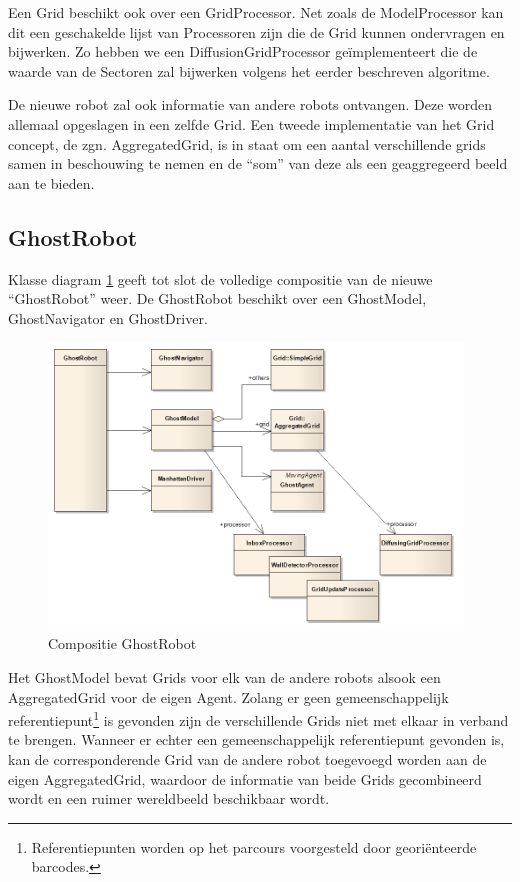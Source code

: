 \documentclass[12pt,a4paper]{report}
\begin{document}
Een Grid beschikt ook over een GridProcessor. Net zoals de ModelProcessor kan dit een geschakelde lijst van Processoren zijn die de Grid kunnen ondervragen en bijwerken. Zo hebben we een DiffusionGridProcessor ge\"implementeert die de waarde van de Sectoren zal bijwerken volgens het eerder beschreven algoritme.

De nieuwe robot zal ook informatie van andere robots ontvangen. Deze worden allemaal opgeslagen in een zelfde Grid. Een tweede implementatie van het Grid concept, de zgn. AggregatedGrid, is in staat om een aantal verschillende grids samen in beschouwing te nemen en de ``som'' van deze als een geaggregeerd beeld aan te bieden.

\subsection{GhostRobot}

Klasse diagram \ref{uml:ghostrobot} geeft tot slot de volledige compositie van de nieuwe ``GhostRobot'' weer. De GhostRobot beschikt over een GhostModel, GhostNavigator en GhostDriver.

\begin{figure}[htbp]
  \centering
  \includegraphics[width=110mm]{resources/ghostrobot.png}
  \caption{Compositie GhostRobot}
  \label{uml:ghostrobot}
\end{figure}

Het GhostModel bevat Grids voor elk van de andere robots alsook een AggregatedGrid voor de eigen Agent. Zolang er geen gemeenschappelijk referentiepunt\footnote{Referentiepunten worden op het parcours voorgesteld door geori\"enteerde barcodes.} is gevonden zijn de verschillende Grids niet met elkaar in verband te brengen. Wanneer er echter een gemeenschappelijk referentiepunt gevonden is, kan de corresponderende Grid van de andere robot toegevoegd worden aan de eigen AggregatedGrid, waardoor de informatie van beide Grids gecombineerd wordt en een ruimer wereldbeeld beschikbaar wordt.
\end{document}
